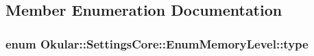 \subsection{Member Enumeration Documentation}
\hypertarget{classOkular_1_1SettingsCore_1_1EnumMemoryLevel_a6dcad4c36c335a5cab78f24dd88090b4}{
\subsubsection[{type}]{\setlength{\rightskip}{0pt plus 5cm}enum {\bf Okular\+::\+Settings\+Core\+::\+Enum\+Memory\+Level\+::type}}}\label{classOkular_1_1SettingsCore_1_1EnumMemoryLevel_a6dcad4c36c335a5cab78f24dd88090b4}
